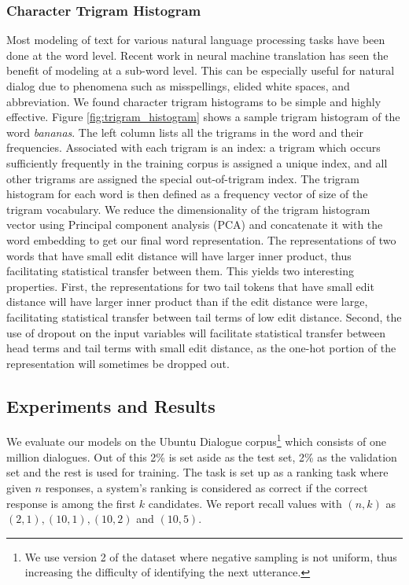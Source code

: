 \documentclass[11pt]{report}
\renewcommand\cite{\citep}	%
\begin{document}
\subsubsection{Character Trigram Histogram} \label{character_trigram_histogram}

Most modeling of text for various natural language processing tasks have been done at the word level. Recent work in neural machine translation has seen the benefit of modeling at a sub-word level. This can be especially useful for natural dialog due to phenomena such as misspellings, elided white spaces, and abbreviation. We found character trigram histograms to be simple and highly effective. Figure \ref{fig:trigram_histogram} shows a sample trigram histogram of the word \textit{bananas}. The left column lists all the trigrams in the word and their frequencies.  Associated with each trigram is an index: a trigram which occurs sufficiently frequently in the training corpus is assigned a unique index, and all other trigrams are assigned the special out-of-trigram index. The trigram histogram for each word is then defined as a frequency vector of size of the trigram vocabulary.  
We reduce the dimensionality of the trigram histogram vector using Principal component analysis (PCA) \cite{tipping1999probabilistic} and concatenate it with the word embedding to get our final word representation. The representations of two words that have small edit distance will have larger inner product, thus facilitating statistical transfer between them.
This yields two interesting properties.  First, the representations for two tail tokens that have small edit distance will have larger inner product than if the edit distance were large, facilitating statistical transfer between tail terms of low edit distance.  Second, the use of dropout on the input variables will facilitate statistical transfer between head terms and tail terms with small edit distance, as the one-hot portion of the representation will sometimes be dropped out.

\subsection{Experiments and Results}\label{ubuntu_experiments_results}

We evaluate our models on the Ubuntu Dialogue corpus\footnote{We use version 2 of the dataset where negative sampling is not uniform, thus increasing the difficulty of identifying the next utterance.} which consists of one million dialogues. Out of this 2\% is set aside as the test set, 2\% as the validation set and the rest is used for training. The task is set up as a ranking task where given $n$ responses, a system's ranking is considered as correct if the correct response is among the first $k$ candidates. We report recall values with $(n,k)$ as $(2,1), (10, 1), (10, 2)$ and $(10, 5)$. 
\end{document}
